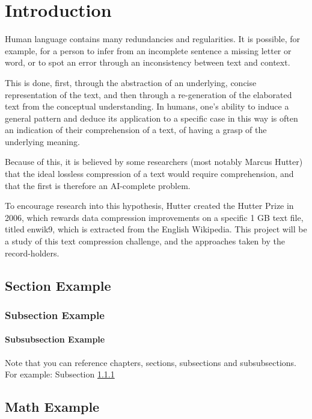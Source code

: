 \chapter{Introduction}

Human language contains many redundancies and regularities. It is possible, for example, for a person to infer from an incomplete sentence a missing letter or word, or to spot an error through an inconsistency between text and context.

This is done, first, through the abstraction of an underlying, concise representation of the text, and then through a re-generation of the elaborated text from the conceptual understanding. In humans, one's ability to induce a general pattern and deduce its application to a specific case in this way is often an indication of their comprehension of a text, of having a grasp of the underlying meaning.

Because of this, it is believed by some researchers (most notably Marcus Hutter) that the ideal lossless compression of a text would require comprehension, and that the first is therefore an AI-complete problem.

To encourage research into this hypothesis, Hutter created the Hutter Prize in 2006, which rewards data compression improvements on a specific 1 GB text file, titled enwik9, which is extracted from the English Wikipedia.
This project will be a study of this text compression challenge, and the approaches taken by the record-holders.

\section{Section Example}
\lipsum[1]
\subsection{Subsection Example}
\label{subsection:example}
\lipsum[1]
\subsubsection{Subsubsection Example}

Note that you can reference chapters, sections, subsections and subsubsections. For example: Subsection \ref{subsection:example}

\section{Math Example}

